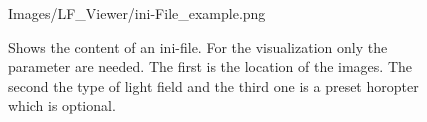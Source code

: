 \begin{figure}[htb]
	\begin{minipage}[h]{\textwidth}
		\centering
		\begin{overpic}[width=0.95\linewidth]{Images/LF_Viewer/ini-File_example.png}
		\end{overpic}
	\end{minipage}
	\caption{Shows the content of an ini-file. For the visualization only the parameter are needed. The first is the location of the images. The second the type of light field and the third one is a preset horopter which is optional.}
	\label{figure_INI_example}
\end{figure}
